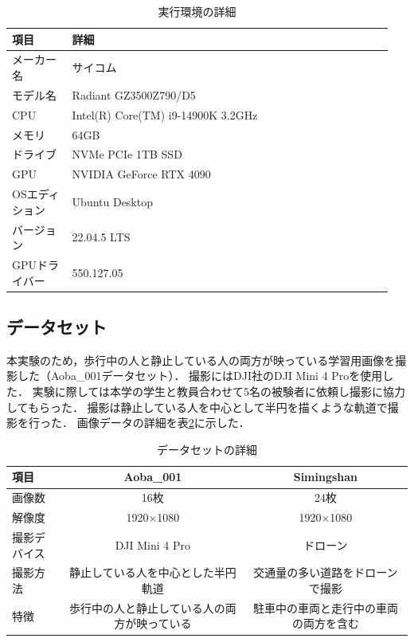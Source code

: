 \documentclass[a4paper,dvipdfmx,ja=standard,9pt]{bxjsarticle}
\begin{document}
\begin{table}[htbp]
  \centering
  \caption{実行環境の詳細}
  \label{tab:environment}
  \begin{tabular}{|p{0.15\linewidth}|p{0.8\linewidth}|}
    \hline
    \textbf{項目} & \textbf{詳細} \\ \hline
    メーカー名 & サイコム \\ \hline
    モデル名 & Radiant GZ3500Z790/D5 \\ \hline
    CPU & Intel(R) Core(TM) i9-14900K 3.2GHz \\ \hline
    メモリ & 64GB \\ \hline
    ドライブ & NVMe PCIe 1TB SSD \\ \hline
    GPU & NVIDIA GeForce RTX 4090 \\ \hline
    OSエディション & Ubuntu Desktop \\ \hline
    バージョン & 22.04.5 LTS \\ \hline
    GPUドライバー & 550.127.05 \\ \hline
  \end{tabular}
\end{table}

\subsection{データセット}
本実験のため，歩行中の人と静止している人の両方が映っている学習用画像を撮影した（Aoba\_001データセット）．
撮影にはDJI社のDJI Mini 4 Proを使用した．
実験に際しては本学の学生と教員合わせて5名の被験者に依頼し撮影に協力してもらった．
撮影は静止している人を中心として半円を描くような軌道で撮影を行った．
画像データの詳細を表\ref{tab:dataset_details}に示した．

\begin{table}[htbp]
  \centering
  \caption{データセットの詳細}
  \begin{tabular}{lcc}
    \toprule
    項目 & Aoba\_001 & Simingshan\cite{tang2025dronesplat3dgaussiansplatting} \\
    \midrule
    画像数 & 16枚 & 24枚 \\
    解像度 & 1920$\times$1080 & 1920$\times$1080 \\
    撮影デバイス & DJI Mini 4 Pro & ドローン \\
    撮影方法 & 静止している人を中心とした半円軌道 & 交通量の多い道路をドローンで撮影 \\
    特徴 & 歩行中の人と静止している人の両方が映っている & 駐車中の車両と走行中の車両の両方を含む \\
    \bottomrule
  \end{tabular}
  \label{tab:dataset_details}
\end{table}
\end{document}
